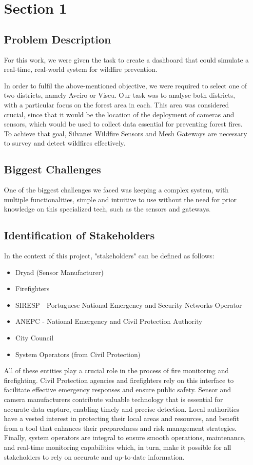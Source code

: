 \chapter{Section 1} \label{section1}
\section{Problem Description}
For this work, we were given the task to create a dashboard 
that could simulate a real-time, real-world system for wildfire 
prevention. \par
In order to fulfil the above-mentioned objective, 
we were required to select one of two districts, 
namely Aveiro or Viseu. Our task was to analyse both districts, 
with a particular focus on the forest area in each. 
This area was considered crucial, since that it would be 
the location of the deployment of cameras and sensors, 
which would be used to collect data essential for preventing forest fires. 
To achieve
that goal, Silvanet Wildfire Sensors and Mesh Gateways are necessary to
survey and detect wildfires effectively. 
\section{Biggest Challenges}
One of the biggest challenges we faced was keeping a complex system, with multiple functionalities, simple
and intuitive to use without the need for prior knowledge on this
specialized tech, such as the sensors and gateways. 
\section{Identification of Stakeholders}
In the context of this project, "stakeholders" can be defined as follows:
\begin{itemize}
    \item Dryad (Sensor Manufacturer)
    \item Firefighters
    \item SIRESP - Portuguese National Emergency 
    and Security Networks Operator 
    \item ANEPC - National Emergency and Civil Protection Authority
    \item City Council
    \item System Operators (from Civil Protection)
\end{itemize} \par 
All of these entities play a crucial role in the process of fire monitoring and firefighting. 
Civil Protection agencies and firefighters rely on this 
interface to facilitate effective emergency responses and 
ensure public safety. Sensor and camera manufacturers contribute 
valuable technology that is essential for accurate data capture, 
enabling timely and precise detection. Local authorities have 
a vested interest in protecting their local areas and resources, 
and benefit from a tool that enhances their preparedness and 
risk management strategies. Finally, system operators are integral 
to ensure smooth operations, maintenance, and real-time monitoring 
capabilities which, in turn, make it possible for all stakeholders 
to rely on accurate and up-to-date information. 
